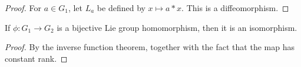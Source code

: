 \documentclass[oneside]{book}                                                  %
\begin{document}
        \begin{proof}
            For $a\in{G}_{1}$, let $L_{a}$ be defined by $x\mapsto{a}*x$. This
            is a diffeomorphism.
        \end{proof}
        \begin{theorem}
            If $\phi:G_{1}\rightarrow{G}_{2}$ is a bijective Lie group
            homomorphism, then it is an isomorphism.
        \end{theorem}
        \begin{proof}
            By the inverse function theorem, together with the fact that the map
            has constant rank.
        \end{proof}
\end{document}
